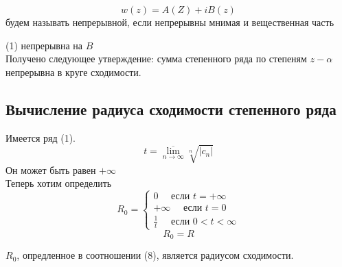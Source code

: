 \documentclass[main]{subfiles}
\begin{document}
\begin{definition}[Непрерывность]
    \[w(z) = A(Z) + iB(z) \] будем называть непрерывной, если непрерывны мнимая и вещественная часть
\end{definition}

(1) непрерывна на $B$ \\
Получено следующее утверждение: сумма степенного ряда по степеням $z-\alpha$ непрерывна в круге сходимости.

\subsection{Вычисление радиуса сходимости степенного ряда}
Имеется ряд (1).
    \[t = \overline{\underset{n \to \infty}{\lim}} \sqrt[n]{|c_n|} \tag{7} \]
Он может быть равен $+\infty$ \\
Теперь хотим определить \[R_0 = \begin{cases}
    0 \quad \text{ если } t = +\infty \\
    +\infty \quad \text{ если } t = 0  \\
    \frac{1}{t} \quad \text{ если } 0 < t < \infty
\end{cases} \tag{8} \]
\[ R_0 = R \tag{9} \]
\begin{theorem}
    $R_0$, опредленное в соотношении (8), является радиусом сходимости.
\end{theorem}
\end{document}
